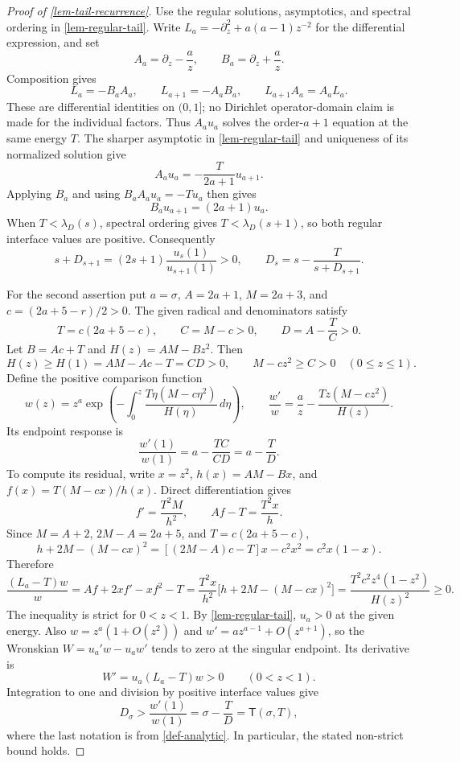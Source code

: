 \documentclass[11pt,a4paper]{article}
\theoremstyle{proofmanuscript}
\begin{document}
\begin{proof}[Proof of \ref{lem-tail-recurrence}]

Use the regular solutions, asymptotics, and spectral ordering in \ref{lem-regular-tail}. Write \(L_a=-\partial_z^2+a(a-1)z^{-2}\) for the differential expression, and set \[
A_a=\partial_z-\frac a z,\qquad B_a=\partial_z+\frac a z.
\] Composition gives \[
L_a=-B_aA_a,\qquad
L_{a+1}=-A_aB_a,\qquad
L_{a+1}A_a=A_aL_a.
\] These are differential identities on \((0,1]\); no Dirichlet operator-domain claim is made for the individual factors. Thus \(A_au_a\) solves the order-\(a+1\) equation at the same energy \(T\). The sharper asymptotic in \ref{lem-regular-tail} and uniqueness of its normalized solution give \[
A_au_a=-\frac{T}{2a+1}u_{a+1}.
\] Applying \(B_a\) and using \(B_aA_au_a=-Tu_a\) then gives \[
B_au_{a+1}=(2a+1)u_a.
\] When \(T<\lambda_D(s)\), spectral ordering gives \(T<\lambda_D(s+1)\), so both regular interface values are positive. Consequently \[
s+D_{s+1}=(2s+1)\frac{u_s(1)}{u_{s+1}(1)}>0,
\qquad
D_s=s-\frac{T}{s+D_{s+1}}.
\]

For the second assertion put \(a=\sigma\), \(A=2a+1\), \(M=2a+3\), and \(c=(2a+5-r)/2>0\). The given radical and denominators satisfy \[
T=c(2a+5-c),\qquad
C=M-c>0,\qquad D=A-\frac TC>0.
\] Let \(B=Ac+T\) and \(H(z)=AM-Bz^2\). Then \[
H(z)\ge H(1)=AM-Ac-T=CD>0,\qquad
M-cz^2\ge C>0
\quad(0\le z\le1).
\] Define the positive comparison function \[
w(z)=z^a\exp\left(-\int_0^z
\frac{T\eta(M-c\eta^2)}{H(\eta)}\,d\eta\right),
\qquad
\frac{w'}w=\frac a z-\frac{Tz(M-cz^2)}{H(z)}.
\] Its endpoint response is \[
\frac{w'(1)}{w(1)}=a-\frac{TC}{CD}=a-\frac TD.
\] To compute its residual, write \(x=z^2\), \(h(x)=AM-Bx\), and \(f(x)=T(M-cx)/h(x)\). Direct differentiation gives \[
f'=\frac{T^2M}{h^2},\qquad Af-T=\frac{T^2x}{h}.
\] Since \(M=A+2\), \(2M-A=2a+5\), and \(T=c(2a+5-c)\), \[
h+2M-(M-cx)^2
=[(2M-A)c-T]x-c^2x^2=c^2x(1-x).
\] Therefore \[
\frac{(L_a-T)w}{w}
=Af+2xf'-xf^2-T
=\frac{T^2x}{h^2}\bigl[h+2M-(M-cx)^2\bigr]
=\frac{T^2c^2z^4(1-z^2)}{H(z)^2}\ge0.
\] The inequality is strict for \(0<z<1\). By \ref{lem-regular-tail}, \(u_a>0\) at the given energy. Also \(w=z^a(1+O(z^2))\) and \(w'=az^{a-1}+O(z^{a+1})\), so the Wronskian \(W=u_a'w-u_aw'\) tends to zero at the singular endpoint. Its derivative is \[
W'=u_a(L_a-T)w>0\qquad(0<z<1).
\] Integration to one and division by positive interface values give \[
D_\sigma>\frac{w'(1)}{w(1)}
=\sigma-\frac TD=\mathsf T(\sigma,T),
\] where the last notation is from \ref{def-analytic}. In particular, the stated non-strict bound holds.

\end{proof}
\end{document}
